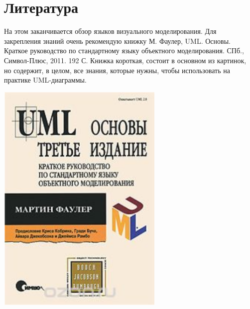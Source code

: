 \documentclass{../mcstext}
\begin{document}
\section{Литература}

\noindent\begin{minipage}{\textwidth}
    \begin{minipage}[c][6cm][c]{\dimexpr0.7\textwidth-0.5\Colsep\relax}
        На этом заканчивается обзор языков визуального моделирования. Для закрепления знаний очень рекомендую книжку М. Фаулер, UML. Основы. Краткое руководство по стандартному языку объектного моделирования. СПб., Символ-Плюс, 2011. 192 С. Книжка короткая, состоит в основном из картинок, но содержит, в целом, все знания, которые нужны, чтобы использовать на практике UML-диаграммы.
    \end{minipage}\hfill
    \begin{minipage}[c][6cm][c]{\dimexpr0.3\textwidth-0.5\Colsep\relax}
        \includegraphics[width=0.6\textwidth]{umlBookCover.png}
    \end{minipage}%
\end{minipage}
\end{document}
